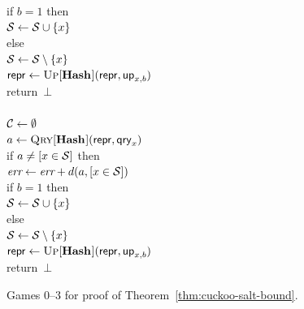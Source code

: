 \begin{figure}
{      if $b = 1$ then\\
      \tab $\mathcal{S} \gets \mathcal{S} \cup \{x\}$\\
      else\\
      \tab $\mathcal{S} \gets \mathcal{S} \setminus \{x\}$\\
      $\mathsf{repr} \gets \textsc{Up}[\mathbf{Hash}\hspace{0.5pt}](\mathsf{repr},\mathsf{up}_{x,b})$\\
      return~$\bot$
    \\[6pt]
    \\[2pt]
      $\mathcal{C} \gets \emptyset$\\
      $a \gets \textsc{Qry}[\mathbf{Hash}\hspace{0.5pt}](\mathsf{repr}, \mathsf{qry}_x)$\\
      if $a \neq [x \in \mathcal{S}]$ then\\
      \tab $\textit{err} \gets \textit{err}+d(a,[x \in \mathcal{S}])$\\
      if $b = 1$ then\\
      \tab $\mathcal{S} \gets \mathcal{S} \cup \{x\}$\\
      else\\
      \tab $\mathcal{S} \gets \mathcal{S} \setminus \{x\}$\\
      $\mathsf{repr} \gets \textsc{Up}[\mathbf{Hash}\hspace{0.5pt}](\mathsf{repr},\mathsf{up}_{x,b})$\\
      return~$\bot$
  }
  {
  }
  {
  }
  \caption{Games 0--3 for proof of Theorem~\ref{thm:cuckoo-salt-bound}.}
  \label{fig:cuckoo-salt-bound}
\end{figure}

